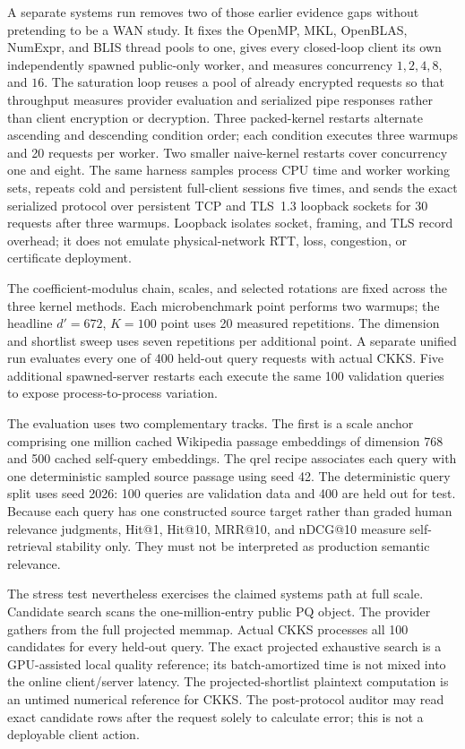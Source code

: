 \documentclass[pdflatex,sn-basic,Numbered]{sn-jnl}
\theoremstyle{plain}
\begin{document}
A separate systems run removes two of those earlier evidence gaps without pretending to be a WAN study. It fixes the OpenMP, MKL, OpenBLAS, NumExpr, and BLIS thread pools to one, gives every closed-loop client its own independently spawned public-only worker, and measures concurrency $1,2,4,8,$ and $16$. The saturation loop reuses a pool of already encrypted requests so that throughput measures provider evaluation and serialized pipe responses rather than client encryption or decryption. Three packed-kernel restarts alternate ascending and descending condition order; each condition executes three warmups and 20 requests per worker. Two smaller naive-kernel restarts cover concurrency one and eight. The same harness samples process CPU time and worker working sets, repeats cold and persistent full-client sessions five times, and sends the exact serialized protocol over persistent TCP and TLS~1.3 loopback sockets for 30 requests after three warmups. Loopback isolates socket, framing, and TLS record overhead; it does not emulate physical-network RTT, loss, congestion, or certificate deployment.

The coefficient-modulus chain, scales, and selected rotations are fixed across the three kernel methods. Each microbenchmark point performs two warmups; the headline $d'=672$, $K=100$ point uses 20 measured repetitions. The dimension and shortlist sweep uses seven repetitions per additional point. A separate unified run evaluates every one of 400 held-out query requests with actual CKKS. Five additional spawned-server restarts each execute the same 100 validation queries to expose process-to-process variation.

The evaluation uses two complementary tracks. The first is a scale anchor comprising one million cached Wikipedia passage embeddings of dimension 768 and 500 cached self-query embeddings. The qrel recipe associates each query with one deterministic sampled source passage using seed 42. The deterministic query split uses seed 2026: 100 queries are validation data and 400 are held out for test. Because each query has one constructed source target rather than graded human relevance judgments, Hit@1, Hit@10, MRR@10, and nDCG@10 measure self-retrieval stability only. They must not be interpreted as production semantic relevance.

The stress test nevertheless exercises the claimed systems path at full scale. Candidate search scans the one-million-entry public PQ object. The provider gathers from the full projected memmap. Actual CKKS processes all 100 candidates for every held-out query. The exact projected exhaustive search is a GPU-assisted local quality reference; its batch-amortized time is not mixed into the online client/server latency. The projected-shortlist plaintext computation is an untimed numerical reference for CKKS. The post-protocol auditor may read exact candidate rows after the request solely to calculate error; this is not a deployable client action.
\end{document}
